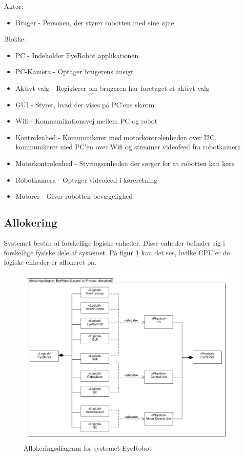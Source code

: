 Aktør:
\begin{itemize}
	\item{Bruger - Personen, der styrer robotten med sine øjne.}
\end{itemize}

Blokke:
\begin{itemize}
	\item{PC             - Indeholder EyeRobot applikationen}
	\item{PC-Kamera      - Optager brugerens ansigt}
	\item{Aktivt valg    - Registerer om brugeren har foretaget et aktivt valg}
	\item{GUI            - Styrer, hvad der vises på PC'ens skærm}
	\item{Wifi           - Kommunikationsvej mellem PC og robot}
	\item{Kontrolenhed   - Kommunikerer med motorkontrolenheden over I2C, kommunikerer med PC'en over Wifi og streamer videofeed fra robotkamera}
	\item{Motorkontrolenhed  - Styringsenheden der sørger for at robotten kan køre}
	\item{Robotkamera   - Optager videofeed i køreretning}
	\item{Motorer        - Giver robotten bevægelighed}
	
\end{itemize}
\newpage

\subsection{Allokering}
Systemet består af forskellige logiske enheder. 
Disse enheder befinder sig i forskellige fysiske dele af systemet. 
På figur \ref{fig:allokeringsdiagram} kan det ses, hvilke CPU’er de logiske enheder er allokeret på.  

\begin{figure}[H]
	\centering
	\includegraphics[width = \textwidth]{figur/allokeringsdiagram.pdf}
	\caption{Allokeringsdiagram for systemet EyeRobot}
	\label{fig:allokeringsdiagram}
\end{figure}
\newpage


